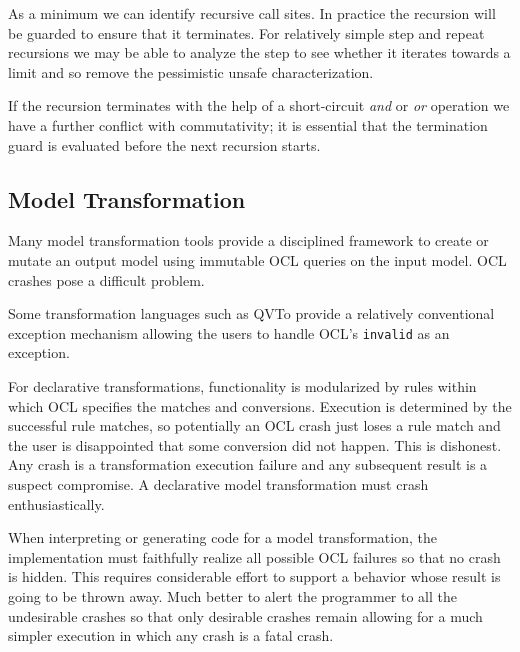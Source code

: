 \documentclass[
]{ceurart}
\begin{document}
As a minimum we can identify recursive call sites. In practice the recursion will be guarded to ensure that it terminates. For relatively simple step and repeat recursions we may be able to analyze the step to see whether it iterates towards a limit and so remove the pessimistic unsafe characterization.

If the recursion terminates with the help of a short-circuit \emph{and} or \emph{or} operation we have a further conflict with commutativity; it is essential that the termination guard is evaluated before the next recursion starts.

\subsection{Model Transformation}

Many model transformation tools provide a disciplined framework to create or mutate an output model using immutable OCL queries on the input model. OCL crashes pose a difficult problem.

Some transformation languages such as QVTo \cite{QVT-1.3} provide a relatively conventional exception mechanism allowing the users to handle OCL's \verb|invalid| as an exception. %

For declarative transformations, functionality is modularized by rules within which OCL specifies the matches and conversions. Execution is determined by the successful rule matches, so potentially an OCL crash just loses a rule match and the user is disappointed that some conversion did not happen. This is dishonest. Any crash is a transformation execution failure and any subsequent result is a suspect compromise. A declarative model transformation must crash enthusiastically.

When interpreting or generating code for a model transformation, the implementation must faithfully realize all possible OCL failures so that no crash is hidden. This requires considerable effort to support a behavior whose result is going to be thrown away. Much better to alert the programmer to all the undesirable crashes so that only desirable crashes remain allowing for a much simpler execution in which any crash is a fatal crash.
 
 
 
\end{document}
